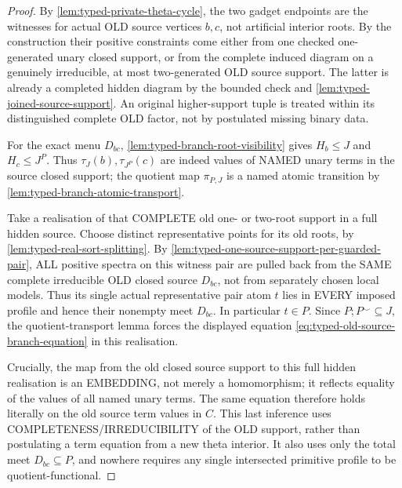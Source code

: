 \begin{proof}
By \cref{lem:typed-private-theta-cycle},
the two gadget endpoints are the
witnesses for actual OLD source
vertices \(b,c\), not artificial
interior roots. By the construction
their positive constraints come
either from one checked
one-generated unary closed
support, or from the complete
induced diagram on a genuinely
irreducible, at most two-generated
OLD source support. The latter
is already a completed hidden
diagram by the bounded check and
\cref{lem:typed-joined-source-support}.
An original higher-support tuple
is treated within its distinguished
complete OLD factor, not by
postulated missing binary data.

For the exact menu \(D_{bc}\),
\cref{lem:typed-branch-root-visibility}
gives
\(H_b\le J\) and
\(H_c\le J^P\).
Thus \(\tau_J(b),\tau_{J^P}(c)\)
are indeed values of NAMED
unary terms in the source
closed support; the quotient
map \(\pi_{P,J}\) is a named
atomic transition by
\cref{lem:typed-branch-atomic-transport}.

Take a realisation of that
COMPLETE old one- or two-root
support in a full hidden source.
Choose distinct representative
points for its old roots, by
\cref{lem:typed-real-sort-splitting}.
By
\cref{lem:typed-one-source-support-per-guarded-pair},
ALL positive spectra on
this witness pair are
pulled back from the SAME
complete irreducible OLD
closed source \(D_{bc}\),
not from separately chosen
local models. Thus its
single actual representative
pair atom \(t\) lies in
EVERY imposed profile
and hence their nonempty
meet \(D_{bc}\).
In particular \(t\in P\).
Since \(P;P^\smile\subseteq J\),
the quotient-transport lemma
forces the displayed equation
\eqref{eq:typed-old-source-branch-equation}
in this realisation.

Crucially, the map from the
old closed source support to
this full hidden realisation
is an EMBEDDING, not merely
a homomorphism; it reflects
equality of the values of
all named unary terms.
The same equation therefore
holds literally on the old
source term values in \(C\).
This last inference uses
COMPLETENESS/IRREDUCIBILITY
of the OLD support, rather
than postulating a term equation
from a new theta interior.
It also uses only the total
meet \(D_{bc}\subseteq P\),
and nowhere requires any
single intersected primitive
profile to be quotient-functional.
\end{proof}

